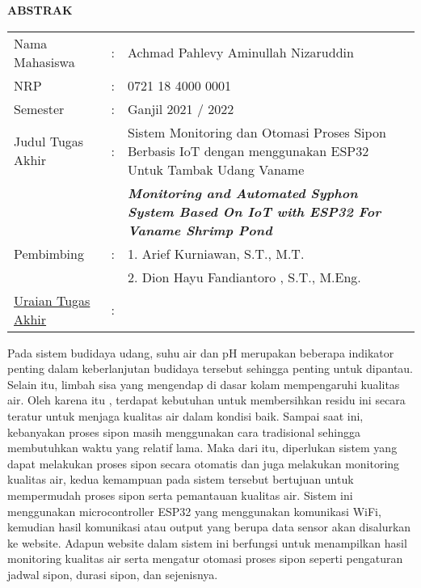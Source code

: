 \begin{center}
  \large\textbf{ABSTRAK}
\end{center}

\vspace{2ex}

\begingroup
  \setlength{\tabcolsep}{0pt}

  \noindent
  \begin{tabularx}{\textwidth}{l >{\centering}m{2em} X}
    Nama Mahasiswa    &:& Achmad Pahlevy Aminullah Nizaruddin \\
    NRP	&:& 0721 18 4000 0001 \\
    Semester	&:& Ganjil 2021 / 2022 \\

    Judul Tugas Akhir &:&	Sistem Monitoring dan Otomasi Proses Sipon Berbasis IoT dengan menggunakan ESP32 Untuk  Tambak Udang Vaname \\
	& & \textbf{\emph{Monitoring and Automated Syphon System Based On IoT with ESP32 For Vaname Shrimp Pond}} \\

    Pembimbing        &:& 1. Arief Kurniawan, S.T., M.T. \\
                      & & 2. Dion Hayu Fandiantoro , S.T., M.Eng. \\
    \underline{Uraian Tugas Akhir}	&:&
  \end{tabularx}
\endgroup


\vspace{0.5cm}
\noindent
Pada sistem budidaya udang, suhu air dan pH merupakan beberapa indikator penting dalam keberlanjutan budidaya tersebut sehingga penting untuk dipantau. Selain itu, limbah sisa yang mengendap di dasar kolam mempengaruhi kualitas air. Oleh karena itu , terdapat kebutuhan untuk membersihkan residu ini secara teratur untuk menjaga kualitas air dalam kondisi baik. Sampai saat ini, kebanyakan proses sipon masih menggunakan cara tradisional sehingga membutuhkan waktu yang relatif lama. Maka dari itu, diperlukan sistem yang dapat melakukan proses sipon secara otomatis dan juga melakukan monitoring kualitas air, kedua kemampuan pada sistem tersebut bertujuan untuk mempermudah proses sipon serta pemantauan kualitas air. Sistem ini menggunakan microcontroller ESP32 yang menggunakan komunikasi WiFi, kemudian hasil komunikasi atau output yang berupa data sensor  akan disalurkan ke website. Adapun website dalam sistem ini berfungsi untuk menampilkan hasil monitoring kualitas air serta mengatur otomasi proses sipon seperti pengaturan jadwal sipon, durasi sipon, dan sejenisnya.

